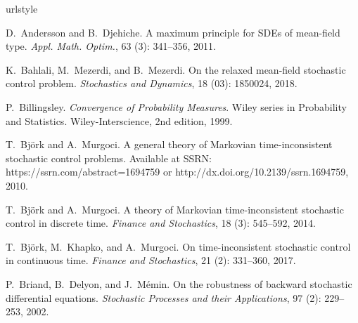 \documentclass[12pt]{article}
\theoremstyle{named}
\numberwithin{equation}{section}
\begin{document}
\footnotesize

% 
% 


\def\cprime{$'$} \def\polhk#1{\setbox0=\hbox{#1}{\ooalign{\hidewidth
  \lower1.5ex\hbox{`}\hidewidth\crcr\unhbox0}}}
  \def\polhk#1{\setbox0=\hbox{#1}{\ooalign{\hidewidth
  \lower1.5ex\hbox{`}\hidewidth\crcr\unhbox0}}} \def\cprime{$'$}
\begin{thebibliography}{31}
\providecommand{\natexlab}[1]{#1}
\providecommand{\url}[1]{\texttt{#1}}
\expandafter\ifx\csname urlstyle\endcsname\relax
  \providecommand{\doi}[1]{doi: #1}\else
  \providecommand{\doi}{doi: \begingroup \urlstyle{rm}\Url}\fi

D.~Andersson and B.~Djehiche.
\newblock A maximum principle for {SDE}s of mean-field type.
\newblock \emph{Appl. Math. Optim.}, 63 (3): 341--356, 2011.

K.~Bahlali, M.~Mezerdi, and B.~Mezerdi.
\newblock On the relaxed mean-field stochastic control problem.
\newblock \emph{Stochastics and Dynamics}, 18 (03): 1850024,
  2018.

P.~Billingsley.
\newblock \emph{Convergence of {P}robability {M}easures}.
\newblock Wiley series in Probability and Statistics. Wiley-Interscience, 2nd
  edition, 1999.

T.~Bj{\"o}rk and A.~Murgoci.
\newblock A general theory of {M}arkovian time-inconsistent stochastic control
  problems.
\newblock Available at SSRN: https://ssrn.com/abstract=1694759 or
  http://dx.doi.org/10.2139/ssrn.1694759, 2010.

T.~Bj{\"o}rk and A.~Murgoci.
\newblock A theory of {M}arkovian time-inconsistent stochastic control in
  discrete time.
\newblock \emph{Finance and Stochastics}, 18 (3): 545--592,
  2014.

T.~Bj{\"o}rk, M.~Khapko, and A.~Murgoci.
\newblock On time-inconsistent stochastic control in continuous time.
\newblock \emph{Finance and Stochastics}, 21 (2): 331--360,
  2017.

P.~Briand, B.~Delyon, and J.~M{\'e}min.
\newblock On the robustness of backward stochastic differential equations.
\newblock \emph{Stochastic Processes and their Applications}, 97
  (2): 229--253, 2002.


\end{thebibliography}
\end{document}
